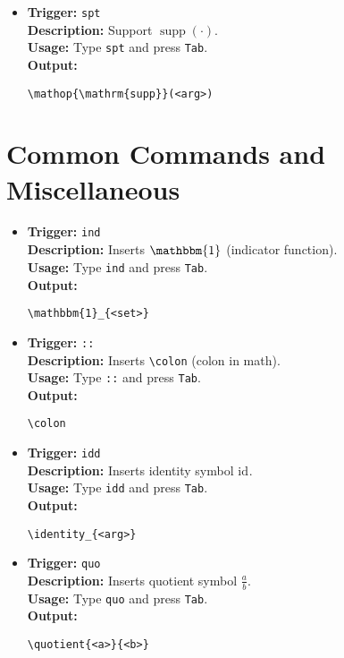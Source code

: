 \documentclass{article}
\newcommand{\identity}{\mathrm{id}}
\newcommand{\quotient}[2]{\frac{#1}{#2}}
\begin{document}
\begin{itemize}[leftmargin=*, label={}]
\item \textbf{Trigger:} \texttt{spt} \\
\textbf{Description:} Support \(\mathop{\mathrm{supp}}(\cdot)\). \\
\textbf{Usage:} Type \texttt{spt} and press \texttt{Tab}. \\
\textbf{Output:}
\begin{verbatim}
\mathop{\mathrm{supp}}(<arg>)
\end{verbatim}
\end{itemize}

\section{Common Commands and Miscellaneous}
\begin{itemize}[leftmargin=*, label={}]
\item \textbf{Trigger:} \texttt{ind} \\
\textbf{Description:} Inserts \(\mathbbm{1}_{}\) (indicator function). \\
\textbf{Usage:} Type \texttt{ind} and press \texttt{Tab}. \\
\textbf{Output:}
\begin{verbatim}
\mathbbm{1}_{<set>}
\end{verbatim}

\item \textbf{Trigger:} \texttt{::} \\
\textbf{Description:} Inserts \verb|\colon| (colon in math). \\
\textbf{Usage:} Type \texttt{::} and press \texttt{Tab}. \\
\textbf{Output:}
\begin{verbatim}
\colon 
\end{verbatim}

\item \textbf{Trigger:} \texttt{idd} \\
\textbf{Description:} Inserts identity symbol \(\identity_{}\). \\
\textbf{Usage:} Type \texttt{idd} and press \texttt{Tab}. \\
\textbf{Output:}
\begin{verbatim}
\identity_{<arg>}
\end{verbatim}

\item \textbf{Trigger:} \texttt{quo} \\
\textbf{Description:} Inserts quotient symbol \(\quotient{a}{b}\). \\
\textbf{Usage:} Type \texttt{quo} and press \texttt{Tab}. \\
\textbf{Output:}
\begin{verbatim}
\quotient{<a>}{<b>}
\end{verbatim}


\end{itemize}
\end{document}
